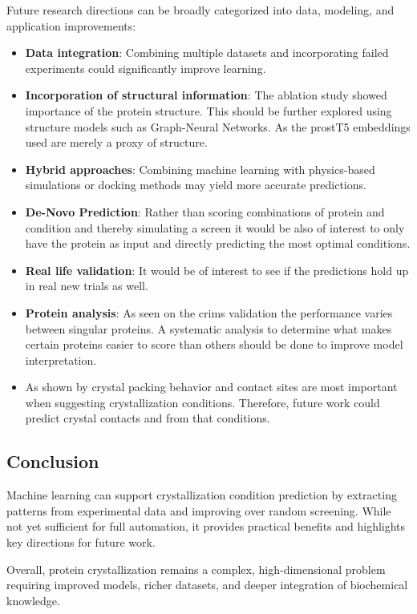 Future research directions can be broadly categorized into data, modeling, and application improvements:

\begin{itemize} \itemsep0em
    \item \textbf{Data integration}: Combining multiple datasets and incorporating failed experiments could significantly improve learning.
    \item \textbf{Incorporation of structural information}: The ablation study showed importance of the protein structure. This should be further explored using structure models such as Graph-Neural Networks. As the \gls{prostT5} embeddings used are merely a proxy of structure.
    \item \textbf{Hybrid approaches}: Combining machine learning with physics-based simulations or docking methods may yield more accurate predictions.
    \item \textbf{De-Novo Prediction}: Rather than scoring  combinations of protein and condition and thereby simulating a screen it would be also of interest to only have the protein as input and directly predicting the most optimal conditions. 
    \item \textbf{Real life validation}: It would be of interest to see if the predictions hold up in real new trials as well. 
    \item \textbf{Protein analysis}: As seen on the \gls{crims} validation the performance varies between singular proteins. A systematic analysis to determine what makes certain proteins easier to score than others should be done to improve model interpretation.
    \item As shown by \citet{Liao2025} crystal packing behavior and contact sites are most important when suggesting crystallization conditions. Therefore, future work could predict crystal contacts and from that conditions.
\end{itemize}


\subsection*{Conclusion}

Machine learning can support crystallization condition prediction by extracting patterns from experimental data and improving over random screening. While not yet sufficient for full automation, it provides practical benefits and highlights key directions for future work.

Overall, protein crystallization remains a complex, high-dimensional problem requiring improved models, richer datasets, and deeper integration of biochemical knowledge.